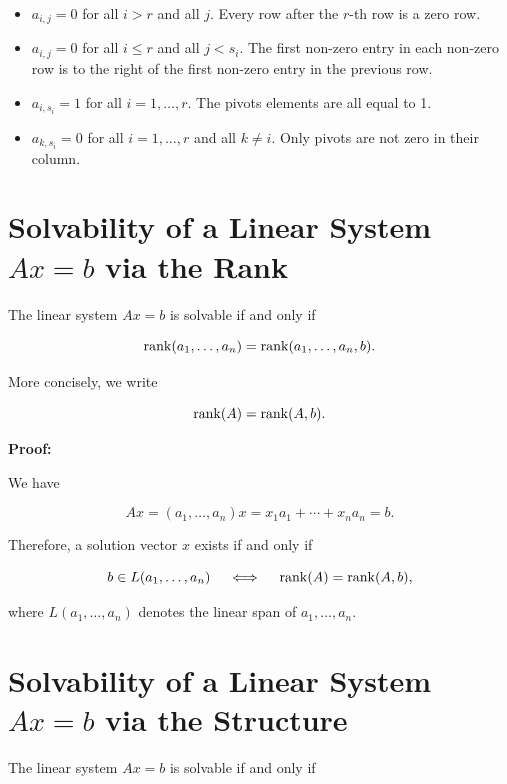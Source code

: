 \begin{itemize}

    \item \(a_{i,j} = 0\) for all \(i > r\) and all \(j\). Every row after the \(r\)-th row is a zero row.

    \item \(a_{i,j} = 0\) for all \(i \le r\) and all \(j < s_i\). The first non-zero entry in each non-zero row is to the right of the first non-zero entry in the previous row.

    \item \(a_{i,s_i} = 1\) for all \(i = 1, \dots, r\). The pivots elements are all equal to 1.

    \item \(a_{k,s_i} = 0\) for all \(i = 1, \dots, r\) and all \(k \neq i\). Only pivots are not zero in their column.

\end{itemize}

\section{Solvability of a Linear System \texorpdfstring{\(Ax = b\)}{} via the Rank}

The linear system \(Ax = b\) is solvable if and only if

\[
    \mathrm{rank}(a_1, \ldots, a_n) = \mathrm{rank}(a_1, \ldots, a_n, b).
\]

More concisely, we write

\[
    \mathrm{rank}(A) = \mathrm{rank}(A, b).
\]

\textbf{Proof:}

We have

\[
    Ax = (a_1, \ldots, a_n)x = x_1 a_1 + \cdots + x_n a_n = b.
\]

Therefore, a solution vector \(x\) exists if and only if

\[
    b \in L(a_1, \ldots, a_n) \quad \iff \quad \mathrm{rank}(A) = \mathrm{rank}(A, b),
\]

where \(L(a_1, \ldots, a_n)\) denotes the linear span of \(a_1, \ldots, a_n\).

\QED

\section{Solvability of a Linear System \texorpdfstring{\(Ax = b\)}{} via the Structure}

The linear system \(Ax = b\) is solvable if and only if 

